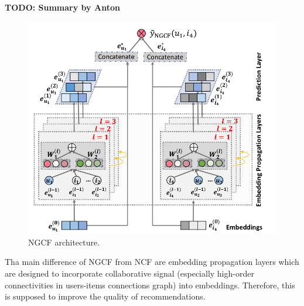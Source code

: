 \textbf{TODO: Summary by Anton}
\begin{figure}[h]
    \centering
    \includegraphics[width=0.8\linewidth]{images/ngcf.png}
    \caption{NGCF architecture.}
    \label{fig:neumf}
\end{figure}

Tha main difference of NGCF from NCF are embedding propagation layers which are 
designed to incorporate collaborative signal (especially high-order connectivities 
in users-items connections graph) into embeddings. Therefore, this is supposed to
improve the quality of recommendations.